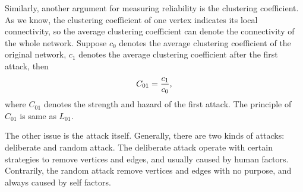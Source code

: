 \documentclass[final]{IEEEtran}
\begin{document}
Similarly, another argument for measuring reliability is the
clustering coefficient. As we know, the clustering coefficient of
one vertex indicates its local connectivity, so the average
clustering coefficient can denote the connectivity of the whole
network. Suppose $c_{0}$ denotes the average clustering
coefficient of the original network, $c_{1}$ denotes the average
clustering coefficient after the first attack, then
\begin{equation}\label{e50}\footnotesize
C_{01}=\frac{c_{1}}{c_{0}},
\end{equation}
where $C_{01}$ denotes the strength and hazard of the first
attack. The principle of $C_{01}$ is same as $L_{01}$.



The other issue is the attack itself. Generally, there are two
kinds of attacks: deliberate and random attack. The deliberate
attack operate with certain strategies to remove vertices and
edges, and usually caused by human factors. Contrarily, the random
attack remove vertices and edges with no purpose, and always
caused by self factors. %
\end{document}

